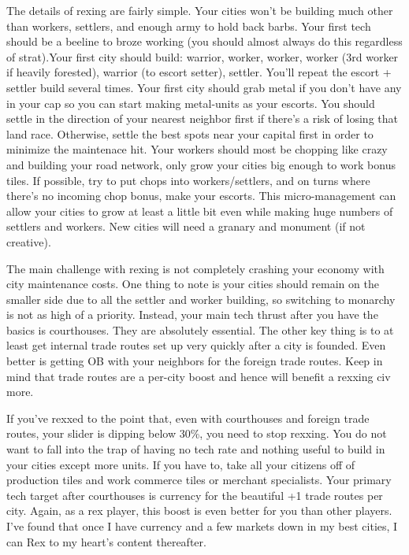\documentclass[10pt]{article}
\begin{document}
The details of rexing are fairly simple. Your cities won't be building much other than workers, settlers, and
enough army to hold back barbs. Your first tech should be a beeline to broze working (you should almost
always do this regardless of strat).Your first city should build: warrior, worker, worker, worker (3rd worker if heavily
forested), warrior (to escort setter), settler. You'll repeat the escort + settler build several times. Your first city
should grab metal if you don't have any in your cap so you can start making metal-units as your escorts. You should settle
in the direction of your nearest neighbor first if there's a risk of losing that land race. Otherwise, settle the best spots
near your capital first in order to minimize the maintenace hit. Your workers should most be chopping like crazy and building your
road network, only grow your cities big enough to work bonus tiles. If possible, try to put chops into workers/settlers, and on
turns where there's no incoming chop bonus, make your escorts. This micro-management can allow your cities to grow at least a
little bit even while making huge numbers of settlers and workers. New cities will need a granary and monument (if not creative).

The main challenge with rexing is not completely crashing your economy with city maintenance costs. One thing to note is
your cities should remain on the smaller side due to all the settler and worker building, so switching to monarchy is not as high of a priority.
Instead, your main tech thrust after you have the basics is courthouses. They are absolutely essential. The other key
thing is to at least get internal trade routes set up very quickly after a city is founded. Even better is getting OB with
your neighbors for the foreign trade routes. Keep in mind that trade routes are a per-city boost and hence will benefit a
rexxing civ more.

If you've rexxed to the point that, even with courthouses and foreign trade routes, your slider is dipping below 30\%, you
need to stop rexxing. You do not want to fall into the trap of having no tech rate and nothing useful to build in your cities
except more units. If you have to, take all your citizens off of production tiles and work commerce tiles or merchant specialists.
Your primary tech target after courthouses is currency for the beautiful +1 trade routes per city. Again, as a rex player, this boost is even
better for you than other players. I've found that once I have currency and a few markets down in my best cities, I can Rex
to my heart's content thereafter.
\end{document}
